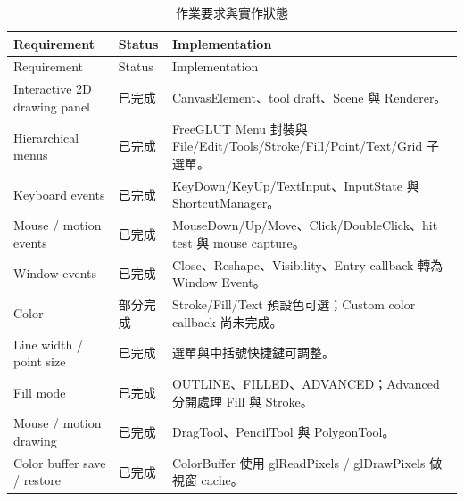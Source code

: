 \begin{longtable}{>{\raggedright\arraybackslash}p{} >{\raggedright\arraybackslash}p{} >{\raggedright\arraybackslash}p{}}
    \caption{作業要求與實作狀態}\label{tab:requirements}                                                                                              \\
    \toprule
    Requirement                            & Status & Implementation                                                                         \\
    \midrule
    \endfirsthead
    \toprule
    Requirement                            & Status & Implementation                                                                         \\
    \midrule
    \endhead
    Interactive 2D drawing panel           & 已完成    & CanvasElement、tool draft、Scene 與 Renderer。                                             \\
    Hierarchical menus                     & 已完成    & FreeGLUT Menu 封裝與 File/Edit/Tools/Stroke/Fill/Point/Text/Grid 子選單。                     \\
    Keyboard events                        & 已完成    & KeyDown/KeyUp/TextInput、InputState 與 ShortcutManager。                                  \\
    Mouse / motion events                  & 已完成    & MouseDown/Up/Move、Click/DoubleClick、hit test 與 mouse capture。                          \\
    Window events                          & 已完成    & Close、Reshape、Visibility、Entry callback 轉為 Window Event。                               \\
    Color                                  & 部分完成   & Stroke/Fill/Text 預設色可選；Custom color callback 尚未完成。                                     \\
    Line width / point size                & 已完成    & 選單與中括號快捷鍵可調整。                                                                          \\
    Fill mode                              & 已完成    & OUTLINE、FILLED、ADVANCED；Advanced 分開處理 Fill 與 Stroke。                                   \\
    Mouse / motion drawing                 & 已完成    & DragTool、PencilTool 與 PolygonTool。                                                     \\
    Color buffer save / restore            & 已完成    & ColorBuffer 使用 glReadPixels / glDrawPixels 做視窗 cache。                                  \\

\end{longtable}
